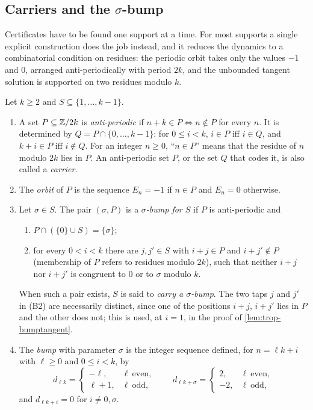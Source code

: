 \subsection{Carriers and the \texorpdfstring{$\sigma$}{sigma}-bump}

Certificates have to be found one support at a time. For most supports a single
explicit construction does the job instead, and it reduces the dynamics to a
combinatorial condition on residues: the periodic orbit takes only the values
$-1$ and $0$, arranged anti-periodically with period $2k$, and the unbounded
tangent solution is supported on two residues modulo $k$.

\begin{definition}
\label{def:bump}
Let $k\ge2$ and $S\subseteq\{1,\dots,k-1\}$.
\begin{enumerate}
\item A set $P\subseteq\mathbb{Z}/2k$ is \textit{anti-periodic} if $n+k\in P\iff n\notin P$
for every $n$. It is determined by $Q=P\cap\{0,\dots,k-1\}$: for $0\le i<k$, $i\in P$
iff $i\in Q$, and $k+i\in P$ iff $i\notin Q$. For an integer $n\ge0$, ``$n\in P$''
means that the residue of $n$ modulo $2k$ lies in $P$. An anti-periodic set $P$,
or the set $Q$ that codes it, is also called a \textit{carrier}.
\item The \textit{orbit} of $P$ is the sequence $E_n=-1$ if $n\in P$ and $E_n=0$
otherwise.
\item Let $\sigma\in S$. The pair $(\sigma,P)$ is a \textit{$\sigma$-bump for $S$}
if $P$ is anti-periodic and
\begin{enumerate}
\item[(B1)] $P\cap(\{0\}\cup S)=\{\sigma\}$;
\item[(B2)] for every $0<i<k$ there are $j,j'\in S$ with $i+j\in P$ and
$i+j'\notin P$ (membership of $P$ refers to residues modulo $2k$), such
that neither $i+j$ nor $i+j'$ is congruent to $0$ or to $\sigma$ modulo
$k$.
\end{enumerate}
When such a pair exists, $S$ is said to \textit{carry a $\sigma$-bump}. The
two taps $j$ and $j'$ in (B2) are necessarily distinct, since one of the
positions $i+j$, $i+j'$ lies in $P$ and the other does not; this is used,
at $i=1$, in the proof of \autoref{lem:trop-bumptangent}.
\item The \textit{bump} with parameter $\sigma$ is the integer sequence defined, for
$n=\ell k+i$ with $\ell\ge0$ and $0\le i<k$, by
\begin{equation}
d_{\ell k}=\begin{cases}-\ell,&\ell\ \text{even},\\ \ell+1,&\ell\ \text{odd},\end{cases}
\qquad
d_{\ell k+\sigma}=\begin{cases}2,&\ell\ \text{even},\\ -2,&\ell\ \text{odd},\end{cases}
\label{eq:trop-bump}
\end{equation}
and $d_{\ell k+i}=0$ for $i\ne0,\sigma$.
\end{enumerate}
\end{definition}

